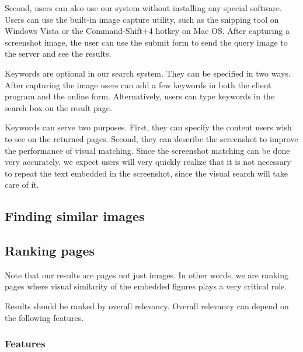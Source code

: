 Second, users can also use our system without installing any
special software. Users can use the built-in image capture
utility, such as the snipping tool on Windows Vista or the
Command-Shift+4 hotkey on Mac OS. After capturing a screenshot
image, the user can use the submit form to send the query image to
the server and see the results.

Keywords are optional in our search system. They can be specified
in two ways. After capturing the image users can add a few
keywords in both the client program and the online form.
Alternatively, users can type keywords in the search box on the
result page.

Keywords can serve two purposes. First, they can specify the
content users wish to see on the returned pages. Second, they can
describe the screenshot to improve the performance of visual
matching. Since the screenshot matching can be done very
accurately, we expect users will very quickly realize that it is
not necessary to repeat the text embedded in the screenshot, since
the visual search will take care of it.



\subsection{Finding similar images}


\subsection{Ranking pages}

Note that our results are pages not just images. In other words,
we are ranking pages where visual similarity of the embedded
figures plays a very critical role.

Results should be ranked by overall relevancy. Overall relevancy
can depend on the following features.

\subsubsection{Features}

